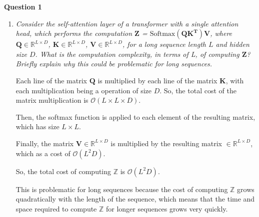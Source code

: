 \documentclass[12pt]{article}
\begin{document}
\center\large{\vskip 0.5cm\textbf{Question 1}}
\begin{enumerate}[leftmargin=\labelsep]

    \item \textit{Consider the self-attention layer of a transformer with a single attention head, which performs the computation $\mathbf{Z}$ = $\text{Softmax}(\mathbf{QK^T})\mathbf{V}$, where $\mathbf{Q} \in \mathbb{R}^{L \times D}$, $\mathbf{K} \in \mathbb{R}^{L \times D}$, $\mathbf{V} \in \mathbb{R}^{L \times D}$, for a long sequence length $L$ and hidden size $D$. What is the computation complexity, in terms of L, of computing $\mathbf{Z}$? Briefly explain why this could be problematic for long sequences.}

          \vspace{12pt}

          Each line of the matrix $\mathbf{Q}$ is multiplied by each line of the matrix $\mathbf{K}$, with each multiplication being a operation of size $D$. So, the total cost of the matrix multiplication is $\mathcal{O} (L \times L \times D)$.

          \vspace{12pt}

          Then, the softmax function is applied to each element of the resulting matrix, which has size $L \times L$.

          \vspace{12pt}

          Finally, the matrix $\mathbf{V} \in \mathbb{R}^{L \times D}$ is multiplied by the resulting matrix $\in \mathbb{R}^{L \times D}$, which as a cost of $\mathcal{O}(L^2D)$.

          \vspace{12pt}

          So, the total cost of computing $\mathbb{Z}$ is $\mathcal{O} (L^2 D)$.

          \vspace{12pt}

          This is problematic for long sequences because the cost of computing $\mathbb{Z}$ grows quadratically with the length of the sequence, which means that the time and space required to compute $\mathbb{Z}$ for longer sequences grows very quickly.


\end{enumerate}
\end{document}
